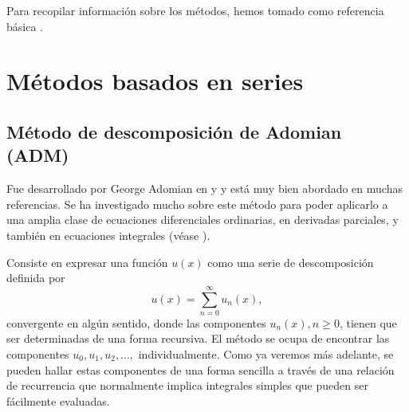 Para recopilar información sobre los métodos, hemos tomado como referencia básica \cite{WazWaz}.
\section{Métodos basados en series}
\subsection{Método de descomposición de Adomian (ADM)}
Fue desarrollado por George Adomian en \cite{Adomian1} y \cite{Adomian12} y está muy bien abordado en muchas referencias. Se ha investigado mucho sobre este método para poder aplicarlo a una amplia clase de ecuaciones diferenciales ordinarias, en derivadas parciales, y también en ecuaciones integrales (véase \cite{Atkinson}).

Consiste en expresar una función $u(x)$ como una serie de descomposición definida por
\begin{equation}\label{eq:sum_adomian}
	u(x) = \sum_{n=0}^{\infty} u_n(x),
\end{equation} 
convergente en algún sentido, donde las componentes $u_n(x), n \geqslant 0$, tienen que ser determinadas de una forma recursiva. El método se ocupa de encontrar las componentes $u_0, u_1, u_2, ...,$ individualmente. Como ya veremos más adelante, se pueden hallar estas componentes de una forma sencilla a través de una relación de recurrencia que normalmente implica integrales simples que pueden ser fácilmente evaluadas.

